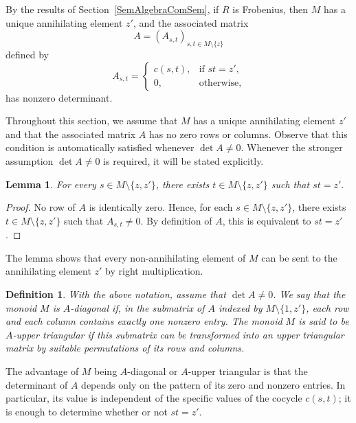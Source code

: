 \documentclass[11pt,reqno]{amsart}
\theoremstyle{plain}
\newtheorem{ddef}[thm]{Definition}
\newtheorem{lem}[thm]{Lemma}
\theoremstyle{remark}
\theoremstyle{definition}
\begin{document}
By the results of Section~\ref{SemAlgebraComSem}, if $R$ is Frobenius, then $M$ has a unique annihilating element $z'$, and the associated matrix
\[
A = (A_{s,t})_{s,t \in M\setminus\{z\}}
\]
defined by
\[
A_{s,t} =
\begin{cases}
c(s,t), & \text{if } st = z',\\
0, & \text{otherwise},
\end{cases}
\]
has nonzero determinant. 

Throughout this section, we assume that \(M\) has a unique annihilating element \(z'\) and that the associated matrix \(A\) has no zero rows or columns. Observe that this condition is automatically satisfied whenever \(\det A\neq0\). Whenever the stronger assumption \(\det A\neq0\) is required, it will be stated explicitly.

\begin{lem}\label{AnnDetOne}
For every $s \in M \setminus \{z,z'\}$, there exists $t \in M \setminus \{z,z'\}$ such that
\(
st = z'.
\)
\end{lem}

\begin{proof}
No row of $A$ is identically zero. Hence, for each $s \in M \setminus \{z,z'\}$, there exists $t \in M \setminus \{z,z'\}$ such that $A_{s,t} \neq 0$. By definition of $A$, this is equivalent to $st = z'$.
\end{proof}

The lemma shows that every non-annihilating element of $M$ can be sent to the annihilating element $z'$ by right multiplication. 

\begin{ddef}
With the above notation, assume that $\det A\neq0$. We say that the monoid $M$ is \emph{$A$-diagonal} if, in the submatrix of $A$ indexed by $M\setminus\{1,z'\}$, each row and each column contains exactly one nonzero entry.
The monoid $M$ is said to be \emph{$A$-upper triangular} if this submatrix can be transformed into an upper triangular matrix by suitable permutations of its rows and columns.
\end{ddef}

The advantage of $M$ being $A$-diagonal or $A$-upper triangular is that the determinant of $A$ depends only on the pattern of its zero and nonzero entries. In particular, its value is independent of the specific values of the cocycle $c(s,t)$; it is enough to determine whether or not $st=z'$.
\end{document}
